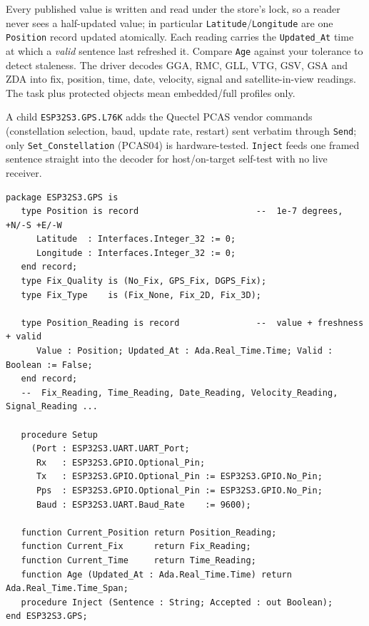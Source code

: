 Every published value is written and read under the store's lock, so a reader never
sees a half-updated value; in particular \texttt{Latitude}/\texttt{Longitude} are
one \texttt{Position} record updated atomically. Each reading carries the
\texttt{Updated\_At} time at which a \emph{valid} sentence last refreshed it.
Compare \texttt{Age} against your tolerance to detect staleness. The driver decodes
GGA, RMC, GLL, VTG, GSV, GSA and ZDA into fix, position, time, date, velocity,
signal and satellite-in-view readings. The task plus protected objects mean
embedded/full profiles only.


A child \texttt{ESP32S3.GPS.L76K} adds the Quectel PCAS vendor commands
(constellation selection, baud, update rate, restart) sent verbatim through
\texttt{Send}; only \texttt{Set\_Constellation} (PCAS04) is hardware-tested.
\texttt{Inject} feeds one framed sentence straight into the decoder for
host/on-target self-test with no live receiver.

\begin{lstlisting}
package ESP32S3.GPS is
   type Position is record                       --  1e-7 degrees, +N/-S +E/-W
      Latitude  : Interfaces.Integer_32 := 0;
      Longitude : Interfaces.Integer_32 := 0;
   end record;
   type Fix_Quality is (No_Fix, GPS_Fix, DGPS_Fix);
   type Fix_Type    is (Fix_None, Fix_2D, Fix_3D);

   type Position_Reading is record               --  value + freshness + valid
      Value : Position; Updated_At : Ada.Real_Time.Time; Valid : Boolean := False;
   end record;
   --  Fix_Reading, Time_Reading, Date_Reading, Velocity_Reading, Signal_Reading ...

   procedure Setup
     (Port : ESP32S3.UART.UART_Port;
      Rx   : ESP32S3.GPIO.Optional_Pin;
      Tx   : ESP32S3.GPIO.Optional_Pin := ESP32S3.GPIO.No_Pin;
      Pps  : ESP32S3.GPIO.Optional_Pin := ESP32S3.GPIO.No_Pin;
      Baud : ESP32S3.UART.Baud_Rate    := 9600);

   function Current_Position return Position_Reading;
   function Current_Fix      return Fix_Reading;
   function Current_Time     return Time_Reading;
   function Age (Updated_At : Ada.Real_Time.Time) return Ada.Real_Time.Time_Span;
   procedure Inject (Sentence : String; Accepted : out Boolean);
end ESP32S3.GPS;
\end{lstlisting}

